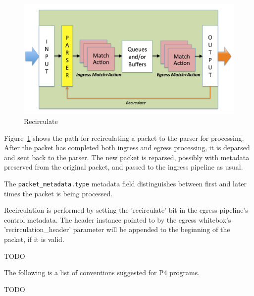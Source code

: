 \documentclass[12pt]{article}
\begin{document}


\begin{figure}[h!]
    \centering
    \includegraphics[width=\textwidth]{figures/recirculate.png}
    \caption{Recirculate}
    \label{fig:recirc}
\end{figure}

Figure~\ref{fig:recirc} shows the path for recirculating a packet to the parser
for processing. After the packet has completed both ingress and egress
processing, it is deparsed and sent back to the parser. The new packet is
reparsed, possibly with metadata preserved from the original packet, and passed
to the ingress pipeline as usual.

The \texttt{packet_metadata.type} metadata field distinguishes between first and
later times the packet is being processed.

Recirculation is performed by setting the 'recirculate' bit in the egress
pipeline's control metadata. The header instance pointed to by the egress
whitebox's 'recirculation_header' parameter will be appended to the
beginning of the packet, if it is valid.



TODO


The following is a list of conventions suggested for P4 programs.

TODO

\end{document}
